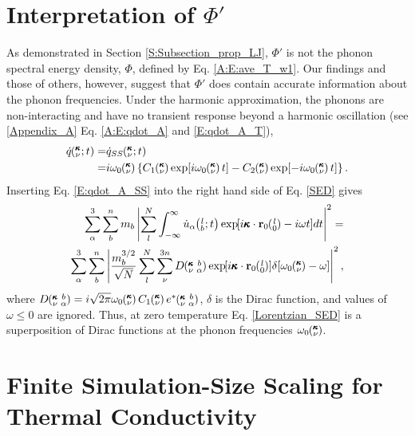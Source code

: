 \documentclass[12pt,twocolumn,iop]{/usr/share/texmf-texlive/tex/latex/iop/iopart}[/usr/share/texmf-texlive/tex/latex/iop/]
\newcommand{\EXP}[1]{\exp\mspace{-5.0mu}\left[#1\right]\mspace{-3.0mu}}
\newcommand{\ab}[2]{\mspace{-4.0mu}\left(\mspace{-8.0mu}\begin{smallmatrix}&\ifthenelse{\equal{#1}{}}{a}{#1} \\&\ifthenelse{\equal{#2}{}}{b}{#2}\end{smallmatrix}\mspace{-3.0mu}\right)}
\newcommand{\kvba}{\mspace{-4.0mu}\left(\mspace{-8.0mu}\begin{smallmatrix} &\pmb{\kappa} &b \\ &\nu &\alpha\end{smallmatrix}\mspace{-3.0mu}\right)}
\newcommand{\kvt}{\mspace{-4.0mu}\left(\mspace{-8.0mu}\begin{smallmatrix}&\pmb{\kappa} \\&\nu\end{smallmatrix}\mspace{-2.0mu};t\right)}
\newcommand{\kv}{\mspace{-4.0mu}\left(\mspace{-8.0mu}\begin{smallmatrix}&\pmb{\kappa} \\&\nu\end{smallmatrix}\mspace{-3.0mu}\right)}
\newcommand{\lbt}{\mspace{-4.0mu}\left(\mspace{-8.0mu}\begin{smallmatrix}&l \\&b\end{smallmatrix}\mspace{-2.0mu};t\right)}
\begin{document}
\section{\label{Appendix_B}Interpretation of $\Phi'$}

As demonstrated in Section \ref{S:Subsection_prop_LJ}, $\Phi'$ is not the phonon spectral energy density, $\Phi$, defined by Eq$.$ \eqref{A:E:ave_T_w1}. Our findings and those of others,\cite{maruyama2003,dekoker2009,thomas2010c,qiu2011,shiomi2011a} however, suggest that $\Phi'$ does contain accurate information about the phonon frequencies.  Under the harmonic approximation, the phonons are non-interacting and have no transient response beyond a harmonic oscillation (see \ref{Appendix_A} Eq$.$ \eqref{A:E:qdot_A} and \eqref{E:qdot_A_T}),
\begin{equation}\label{E:qdot_A_SS}
\begin{split}
\dot{q}\kvt =& \dot{q}_{SS}\kvt  \\
=& i\omega_0\kv\left\{C_1\kv\exp[i\omega_0\kv t]-C_2\kv\exp[-i\omega_0\kv t]\right\}.
 \end{split}
\end{equation}
Inserting Eq$.$ \eqref{E:qdot_A_SS} into the right hand side of Eq$.$ \eqref{SED} gives
\begin{equation}\label{Delta_SED}
\begin{split}
\sum_\alpha^3 \sum_b^n m_b \left| \sum_l^N  \int_{-\infty}^{\infty} \dot{u}_{\alpha}\lbt \EXP{i\pmb{\kappa}\cdot\mathbf{r}_0\ab{l}{0}-i\omega t} dt \right|^2 =& \\
\sum_\alpha^3 \sum_b^n\left| \frac{m_b^{3/2}}{\sqrt{N}} \sum_l^N \sum_{\nu}^{3n}  D\kvba \EXP{i\pmb{\kappa}\cdot\mathbf{r}_0\ab{l}{0}} \delta[ \omega_0\kv - \omega] \right|^2 ,
 \end{split}
\end{equation}
where $D\kvba = i\sqrt{2\pi} \omega_0\kv C_1\kv e^*\kvba$, $\delta$ is the Dirac function, and values of $\omega \le 0$ are ignored. Thus, at zero temperature Eq$.$ \eqref{Lorentzian_SED} is a superposition of Dirac functions at the phonon frequencies $\omega_0\kv$.

\section{\label{Appendix_C}Finite Simulation-Size Scaling for Thermal Conductivity}
\end{document}
